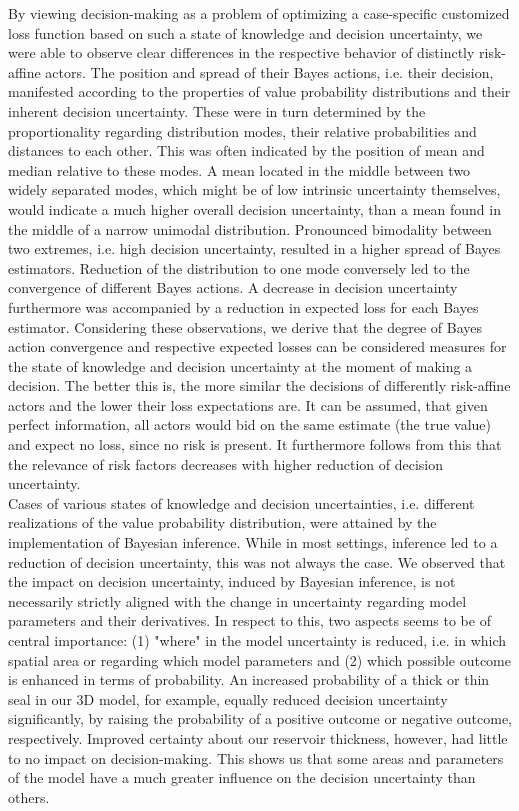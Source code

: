 	By viewing decision-making as a problem of optimizing a case-specific customized loss function based on such a state of knowledge and decision uncertainty, we were able to observe clear differences in the respective behavior of distinctly risk-affine actors.
	The position and spread of their Bayes actions, i.e. their decision, manifested according to the properties of value probability distributions and their inherent decision uncertainty. These were in turn determined by the proportionality regarding distribution modes, their relative probabilities and distances to each other. This was often indicated by the position of mean and median relative to these modes. A mean located in the middle between two widely separated modes, which might be of low intrinsic uncertainty themselves, would indicate a much higher overall decision uncertainty, than a mean found in the middle of a narrow unimodal distribution. Pronounced bimodality between two extremes, i.e. high decision uncertainty, resulted in a higher spread of Bayes estimators. Reduction of the distribution to one mode conversely led to the convergence of different Bayes actions. A decrease in decision uncertainty furthermore was accompanied by a reduction in expected loss for each Bayes estimator. 
	Considering these observations, we derive that the degree of Bayes action convergence and respective expected losses can be considered measures for the state of knowledge and decision uncertainty at the moment of making a decision. The better this is, the more similar the decisions of differently risk-affine actors and the lower their loss expectations are. It can be assumed, that given perfect information, all actors would bid on the same estimate (the true value) and expect no loss, since no risk is present. It furthermore follows from this that the relevance of risk factors decreases with higher reduction of decision uncertainty.\\	
	Cases of various states of knowledge and decision uncertainties, i.e. different realizations of the value probability distribution, were attained by the implementation of Bayesian inference. While in most settings, inference led to a reduction of decision uncertainty, this was not always the case. We observed that the impact on decision uncertainty, induced by Bayesian inference, is not necessarily strictly aligned with the change in uncertainty regarding model parameters and their derivatives. In respect to this, two aspects seems to be of central importance: (1) "where" in the model uncertainty is reduced, i.e. in which spatial area or regarding which model parameters and (2) which possible outcome is enhanced in terms of probability. An increased probability of a thick or thin seal in our 3D model, for example, equally reduced decision uncertainty significantly, by raising the probability of a positive outcome or negative outcome, respectively. Improved certainty about our reservoir thickness, however, had little to no impact on decision-making. This shows us that some areas and parameters of the model have a much greater influence on the decision uncertainty than others.\\
